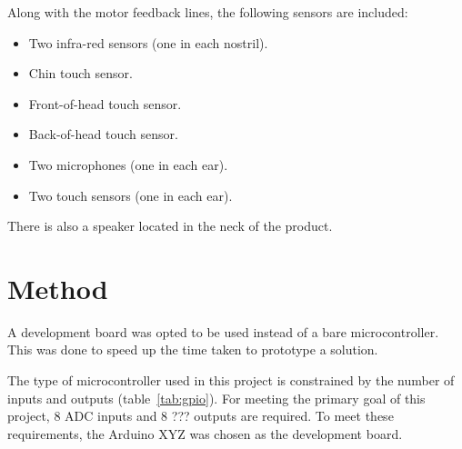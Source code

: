 \documentclass[11pt]{article} %
\begin{document}
Along with the motor feedback lines, the following sensors are included:
\begin{itemize}
	\item Two infra-red sensors (one in each nostril).
	\item Chin touch sensor.
	\item Front-of-head touch sensor.
	\item Back-of-head touch sensor.
	\item Two microphones (one in each ear).
	\item Two touch sensors (one in each ear).
\end{itemize}

There is also a speaker located in the neck of the product.

\section{Method}

A development board was opted to be used instead of a bare microcontroller.
This was done to speed up the time taken to prototype a solution.

The type of microcontroller used in this project is constrained by the number of inputs and outputs (table~\ref{tab:gpio}).
For meeting the primary goal of this project, 8 ADC inputs and 8 ??? outputs are required.
To meet these requirements, the Arduino XYZ was chosen as the development board.
\end{document}

